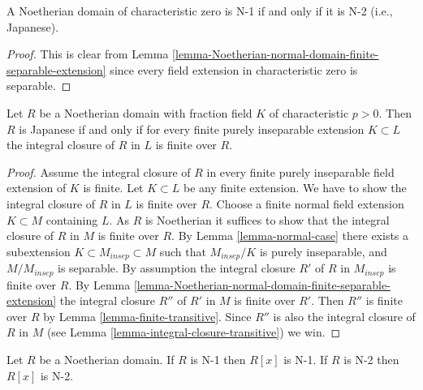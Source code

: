 \begin{lemma}
\label{lemma-domain-char-zero-N-1-2}
A Noetherian domain of characteristic zero is N-1 if and only if
it is N-2 (i.e., Japanese).
\end{lemma}

\begin{proof}
This is clear from
Lemma \ref{lemma-Noetherian-normal-domain-finite-separable-extension}
since every field extension in characteristic zero is separable.
\end{proof}

\begin{lemma}
\label{lemma-domain-char-p-N-1-2}
Let $R$ be a Noetherian domain with fraction field $K$ of
characteristic $p > 0$. Then $R$ is Japanese if and only if
for every finite purely inseparable extension $K \subset L$ the integral
closure of $R$ in $L$ is finite over $R$.
\end{lemma}

\begin{proof}
Assume the integral closure of $R$ in every finite purely inseparable
field extension of $K$ is finite.
Let $K \subset L$ be any finite extension. We have to show the
integral closure of $R$ in $L$ is finite over $R$.
Choose a finite normal field extension $K \subset M$
containing $L$. As $R$ is Noetherian it suffices to show that
the integral closure of $R$ in $M$ is finite over $R$.
By Lemma \ref{lemma-normal-case}
there exists a subextension $K \subset M_{insep} \subset M$
such that $M_{insep}/K$ is purely inseparable, and $M/M_{insep}$
is separable. By assumption the integral closure $R'$ of $R$ in
$M_{insep}$ is finite over $R$. By
Lemma \ref{lemma-Noetherian-normal-domain-finite-separable-extension}
the integral
closure $R''$ of $R'$ in $M$ is finite over $R'$. Then $R''$ is finite
over $R$ by Lemma \ref{lemma-finite-transitive}.
Since $R''$ is also the integral closure
of $R$ in $M$ (see Lemma \ref{lemma-integral-closure-transitive}) we win.
\end{proof}

\begin{lemma}
\label{lemma-polynomial-ring-N-2}
Let $R$ be a Noetherian domain.
If $R$ is N-1 then $R[x]$ is N-1.
If $R$ is N-2 then $R[x]$ is N-2.
\end{lemma}

